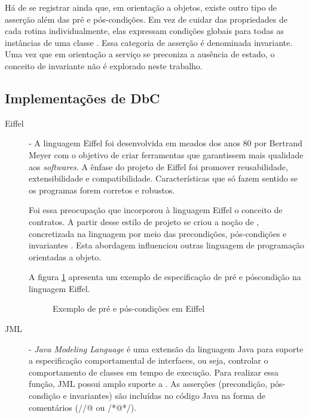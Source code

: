 Há de se registrar ainda que, em orientação a objetos, existe outro tipo de
asserção além das pré e pós-condições. Em vez de cuidar das propriedades de cada
rotina individualmente, elas expressam condições globais para todas as
instâncias de uma classe \cite{meyer1997object}. Essa categoria de
asserção é denominada invariante. Uma vez que em orientação a serviço se
preconiza a ausência de estado, o conceito de invariante não é explorado neste trabalho.



\subsection{Implementações de DbC}
\label{implementDbC}

\begin{description}
\item[Eiffel] - A linguagem Eiffel foi desenvolvida em meados dos anos 80 por
Bertrand Meyer \cite{meyer1988eiffel} com o objetivo de criar ferramentas que
garantissem mais qualidade aos \textit{softwares}. A ênfase do projeto de
Eiffel foi promover reusabilidade, extensibilidade e compatibilidade.
Características que só fazem sentido se os programas forem corretos e
robustos.

Foi essa preocupação que incorporou à linguagem Eiffel o conceito de contratos.
A partir desse estilo de projeto se criou a noção de \designbycontract{},
concretizada na linguagem por meio das precondições, pós-condições e invariantes
\cite{meyer1988eiffel}. Esta abordagem influenciou outras linguagem de programação orientadas a objeto.

A figura \ref{lst:exemploEiffel} apresenta um exemplo de especificação de pré e
póscondição na linguagem Eiffel.

\vspace{6mm}

\begin{figure}[h]
\begin{small}

\vspace{-.5cm}
\end{small}
\caption{Exemplo de pré e pós-condições em Eiffel}
\label{lst:exemploEiffel}
\end{figure}


\item[JML] - \textit{Java Modeling Language} é uma extensão da linguagem Java
para suporte a especificação comportamental de interfaces, ou seja, controlar o
comportamento de classes em tempo de execução. Para realizar essa função, JML
possui amplo suporte a \designbycontract{}. As asserções (precondição,
pós-condição e invariantes) são incluídas no código Java na forma de comentários
(//@ ou /*@\ldots@*/).


\end{description}
